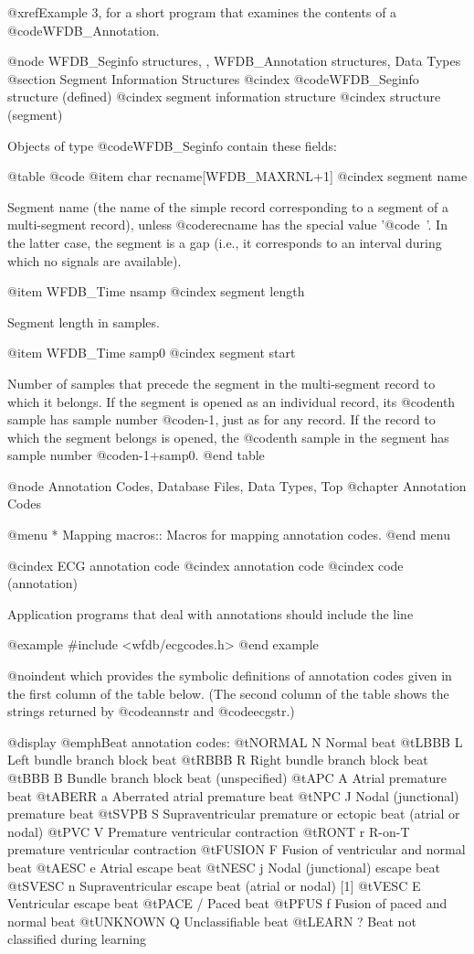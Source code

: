 {{{{{{{{{@xref{Example 3}, for a short program that examines the contents of a
@code{WFDB_Annotation}.

@node WFDB_Seginfo structures, , WFDB_Annotation structures, Data Types
@section Segment Information Structures
@cindex @code{WFDB_Seginfo} structure (defined)
@cindex segment information structure
@cindex structure (segment)

Objects of type @code{WFDB_Seginfo} contain these fields:

@table @code
@item char recname[WFDB_MAXRNL+1]
@cindex segment name

Segment name (the name of the simple record corresponding
to a segment of a multi-segment record), unless @code{recname}
has the special value '@code{~}'.  In the latter case, the
segment is a gap (i.e., it corresponds to an interval during
which no signals are available).

@item WFDB_Time nsamp
@cindex segment length

Segment length in samples.

@item WFDB_Time samp0
@cindex segment start

Number of samples that precede the segment in the multi-segment record
to which it belongs.  If the segment is opened as an individual
record, its @code{n}th sample has sample number @code{n-1}, just as
for any record.  If the record to which the segment belongs is opened,
the @code{n}th sample in the segment has sample number @code{n-1+samp0}.
@end table

@node     Annotation Codes, Database Files, Data Types, Top
@chapter Annotation Codes

@menu
* Mapping macros::		Macros for mapping annotation codes.
@end menu

@cindex ECG annotation code
@cindex annotation code
@cindex code (annotation)

Application programs that deal with annotations should include the
line

@example
#include <wfdb/ecgcodes.h>
@end example

@noindent
which provides the symbolic definitions of annotation codes given in the
first column of the table below.  (The second column of the table shows
the strings returned by @code{annstr} and @code{ecgstr}.)

@display
@emph{Beat annotation codes:}
@t{NORMAL   N  } Normal beat
@t{LBBB     L  } Left bundle branch block beat
@t{RBBB     R  } Right bundle branch block beat
@t{BBB      B  } Bundle branch block beat (unspecified)
@t{APC      A  } Atrial premature beat
@t{ABERR    a  } Aberrated atrial premature beat
@t{NPC      J  } Nodal (junctional) premature beat
@t{SVPB     S  } Supraventricular premature or ectopic beat (atrial or nodal)
@t{PVC      V  } Premature ventricular contraction
@t{RONT     r  } R-on-T premature ventricular contraction
@t{FUSION   F  } Fusion of ventricular and normal beat
@t{AESC     e  } Atrial escape beat
@t{NESC     j  } Nodal (junctional) escape beat
@t{SVESC    n  } Supraventricular escape beat (atrial or nodal) [1]
@t{VESC     E  } Ventricular escape beat
@t{PACE     /  } Paced beat
@t{PFUS     f  } Fusion of paced and normal beat
@t{UNKNOWN  Q  } Unclassifiable beat
@t{LEARN    ?  } Beat not classified during learning

}}}}}}}}}
